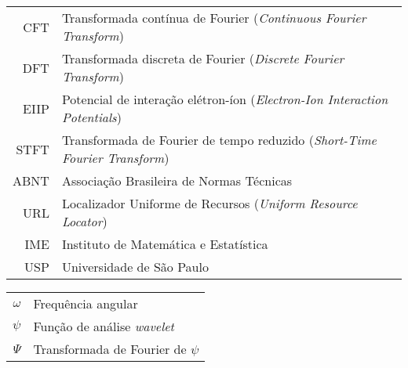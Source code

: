 \documentclass[a4paper,12pt,twoside,brazilian,english]{book}
\begin{document}
\begin{tabular}{rl}
   CFT & Transformada contínua de Fourier (\emph{Continuous Fourier Transform})\\
   DFT & Transformada discreta de Fourier (\emph{Discrete Fourier Transform})\\
  EIIP & Potencial de interação elétron-íon (\emph{Electron-Ion Interaction Potentials})\\
  STFT & Transformada de Fourier de tempo reduzido (\emph{Short-Time Fourier Transform})\\
  ABNT & Associação Brasileira de Normas Técnicas\\
   URL & Localizador Uniforme de Recursos (\emph{Uniform Resource Locator})\\
   IME & Instituto de Matemática e Estatística\\
   USP & Universidade de São Paulo
\end{tabular}


\begin{tabular}{rl}
  $\omega$ & Frequência angular\\
    $\psi$ & Função de análise \emph{wavelet}\\
    $\Psi$ & Transformada de Fourier de $\psi$\\
\end{tabular}

\clearpage


\disablenewpage{\listoffigures}

\disablenewpage{\listoftables}

\end{document}

